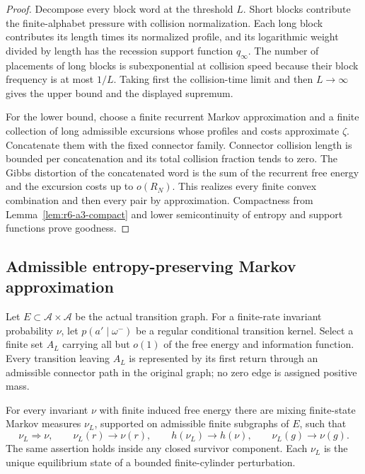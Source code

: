 \begin{proof}
Decompose every block word at the threshold \(L\).  Short blocks contribute
the finite-alphabet pressure with collision normalization.  Each long block
contributes its length times its normalized profile, and its logarithmic
weight divided by length has the recession support function
\(q_\infty\).  The number of placements of long blocks is subexponential at
collision speed because their block frequency is at most \(1/L\).  Taking
first the collision-time limit and then \(L\to\infty\) gives the upper bound
and the displayed supremum.

For the lower bound, choose a finite recurrent Markov approximation and a
finite collection of long admissible excursions whose profiles and costs
approximate \(\zeta\).  Concatenate them with the fixed connector family.
Connector collision length is bounded per concatenation and its total
collision fraction tends to zero.  The Gibbs distortion of the concatenated
word is the sum of the recurrent free energy and the excursion costs up to
\(o(R_N)\).  This realizes every finite convex combination and then every
pair by approximation.  Compactness from
Lemma~\ref{lem:r6-a3-compact} and lower semicontinuity of entropy and support
functions prove goodness.
\end{proof}

\subsection{Admissible entropy-preserving Markov approximation}

Let \(E\subset\mathcal A\times\mathcal A\) be the actual transition graph.
For a finite-rate invariant probability \(\nu\), let
\(p(a'\mid\omega^- )\) be a regular conditional transition kernel.  Select a
finite set \(A_L\) carrying all but \(o(1)\) of the free energy and information
function.  Every transition leaving \(A_L\) is represented by its first
return through an admissible connector path in the original graph; no zero
edge is assigned positive mass.

\begin{lemma}
\label{lem:r6-a3-markov}
For every invariant \(\nu\) with finite induced free energy there are mixing
finite-state Markov measures \(\nu_L\), supported on admissible finite
subgraphs of \(E\), such that
\[
\nu_L\Rightarrow\nu,\qquad
\nu_L(r)\to\nu(r),\qquad
h(\nu_L)\to h(\nu),\qquad
\nu_L(g)\to\nu(g).
\]
The same assertion holds inside any closed survivor component.  Each
\(\nu_L\) is the unique equilibrium state of a bounded finite-cylinder
perturbation.
\end{lemma}

